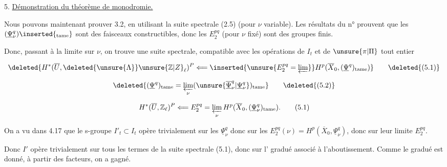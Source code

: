 
5. \uline{Démonstration du théorème de monodromie.}

Nous pouvons maintenant prouver 3.2, en utilisant la suite spectrale (2.5)  (pour $\nu$ variable). Les résultats du n°  prouvent que les $(\underline{\Psi}_\nu^q)\inserted{_{\mathrm{tame}}}$ sont des faisceaux constructibles, donc les $E_2^{pq}$  (pour $\nu$ fixé) sont des groupes finis.

Donc, passant à la limite sur $\nu$, on trouve une suite spectrale, compatible avec les opérations de $I_t$ et  de $\unsure{\pi|\Pi}$ tout entier

\[
\deleted{H^*(\overline U,\deleted{\unsure{\Lambda}}\unsure{\mathbb{Z}|Z}_\ell)^P\Longleftarrow\inserted{\unsure{E_2^{pq}=\varprojlim}}H^p(\overline X_0,(\underline{\Psi}^q)_{\mathrm{tame}})}
\tag*{\deleted{(5.1)}}
\]

\[
\deleted{(\underline{\Psi}^q)_{\mathrm{tame}}=\varprojlim_\nu(\unsure{\overline{\underline{\Psi}}_\nu^q|\underline{\Psi}_\nu^q})_{\mathrm{tame}}}
\tag*{\deleted{(5.2)}}
\]

\[
H^*(\overline U,\mathbb{Z}_\ell)^P\Longleftarrow E_2^{pq}=\varprojlim_\nu H^p(\overline X_0,(\underline{\Psi}_\nu^q)_{\mathrm{tame}}).
\tag*{(5.1)}
\]

On a vu dans 4.17 que le s-groupe $I'_t\subset I_t$ opère trivialement sur les $\underline{\Psi}_\nu^q$ donc  sur les $E_2^{pq}(\nu)=H^p(\overline X_0,\underline{\Psi}_\nu^q)$, donc sur leur limite $E_2^{pq}$.

Donc $I'$ opère trivialement sur tous les termes de la suite spectrale (5.1), donc sur l' gradué associé à l'aboutissement. Comme le  gradué est donné,  à partir des facteurs, on a gagné.
